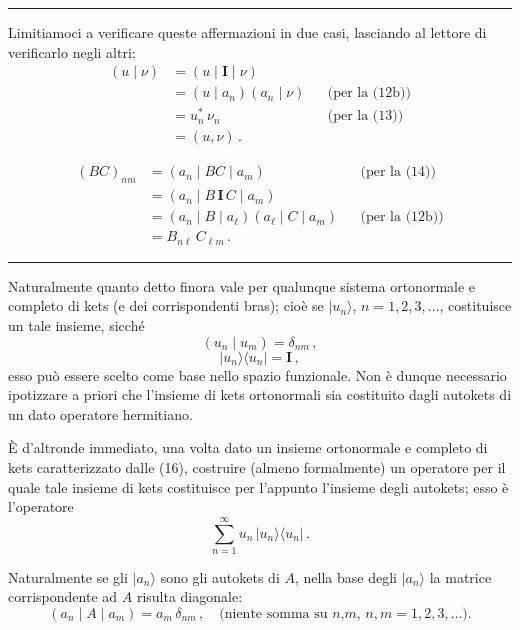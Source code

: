 \documentclass[11pt, a4paper]{book}
\numberwithin{equation}{section}
\begin{document}
\hrule
\medskip
Limitiamoci a verificare queste affermazioni in due casi, lasciando al lettore di verificarlo negli altri:
\begin{align*}
(u\mid\nu) &= (u\mid\mathbf{I}\mid\nu)\\
&=(u\mid a_n)(a_n\mid\nu) && \text{(per la (12b))}\\
&=u_n^*\,\nu_n && \text{(per la (13))}\\
&=(u,\nu)\,.
\end{align*}

\begin{align*}
(BC)_{nm} &= (a_n\mid BC\mid a_m) && \text{(per la (14))}\\
&= (a_n\mid B\,\mathbf{I}\,C\mid a_m)\\
&= (a_n\mid B\mid a_\ell)(a_\ell\mid C\mid a_m) && \text{(per la (12b))}\\
&= B_{n\ell}\,C_{\ell m}\,.
\end{align*}
\medskip\hrule\medskip

Naturalmente quanto detto finora vale per qualunque sistema ortonormale e completo di kets (e dei corrispondenti bras); cioè se $|u_n\rangle$, $n=1,2,3,\ldots$, costituisce un tale insieme, sicché
\begin{equation}
(u_n\mid u_m)=\delta_{nm}\,, \tag{16a}
\end{equation}
\begin{equation}
|u_n\rangle\langle u_n|=\mathbf{I}\,, \tag{16b}
\end{equation}
esso può essere scelto come base nello spazio funzionale. Non è dunque necessario ipotizzare a priori che l'insieme di kets ortonormali sia costituito dagli autokets di un dato operatore hermitiano.

È d'altronde immediato, una volta dato un insieme ortonormale e completo di kets caratterizzato dalle (16), costruire (almeno formalmente) un operatore per il quale tale insieme di kets costituisce per l'appunto l'insieme degli autokets; esso è l'operatore
\[
\sum_{n=1}^{\infty}u_n\,|u_n\rangle\langle u_n|\,.
\]

Naturalmente se gli $|a_n\rangle$ sono gli autokets di $A$, nella base degli $|a_n\rangle$ la matrice corrispondente ad $A$ risulta diagonale:
\begin{equation}
(a_n\mid A\mid a_m)=a_m\,\delta_{nm}\,,\quad\text{(niente somma su $n$,$m$, $n,m=1,2,3,\ldots$).} \tag{17}
\end{equation}
\end{document}
